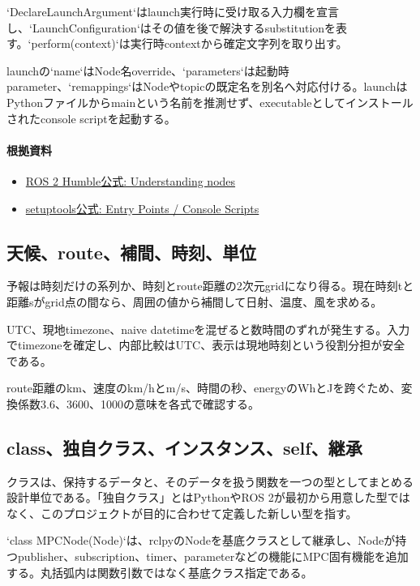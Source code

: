 \documentclass[a4paper,11pt]{article}
\begin{document}
`DeclareLaunchArgument`はlaunch実行時に受け取る入力欄を宣言し、`LaunchConfiguration`はその値を後で解決するsubstitutionを表す。`perform(context)`は実行時contextから確定文字列を取り出す。


launchの`name`はNode名override、`parameters`は起動時parameter、`remappings`はNodeやtopicの既定名を別名へ対応付ける。launchはPythonファイルからmainという名前を推測せず、executableとしてインストールされたconsole scriptを起動する。

\paragraph{根拠資料}
\begin{itemize}[leftmargin=1.6em]
\item \href{https://docs.ros.org/en/humble/Tutorials/Beginner-CLI-Tools/Understanding-ROS2-Nodes/Understanding-ROS2-Nodes.html}{ROS 2 Humble公式: Understanding nodes}
\item \href{https://setuptools.pypa.io/en/latest/userguide/entry_point.html}{setuptools公式: Entry Points / Console Scripts}
\end{itemize}

\subsection{天候、route、補間、時刻、単位}
予報は時刻だけの系列か、時刻とroute距離の2次元gridになり得る。現在時刻tと距離sがgrid点の間なら、周囲の値から補間して日射、温度、風を求める。


UTC、現地timezone、naive datetimeを混ぜると数時間のずれが発生する。入力でtimezoneを確定し、内部比較はUTC、表示は現地時刻という役割分担が安全である。


route距離のkm、速度のkm/hとm/s、時間の秒、energyのWhとJを跨ぐため、変換係数3.6、3600、1000の意味を各式で確認する。



\subsection{class、独自クラス、インスタンス、self、継承}
クラスは、保持するデータと、そのデータを扱う関数を一つの型としてまとめる設計単位である。「独自クラス」とはPythonやROS 2が最初から用意した型ではなく、このプロジェクトが目的に合わせて定義した新しい型を指す。


`class MPCNode(Node)`は、rclpyのNodeを基底クラスとして継承し、Nodeが持つpublisher、subscription、timer、parameterなどの機能にMPC固有機能を追加する。丸括弧内は関数引数ではなく基底クラス指定である。
\end{document}
